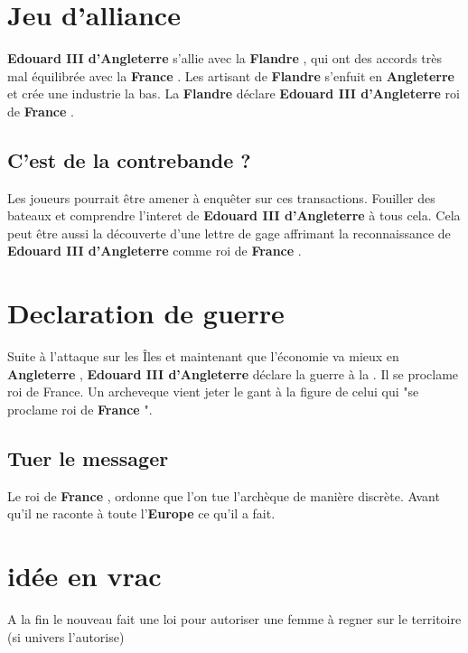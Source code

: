 \documentclass[oneside,12pt]{book}
\newcommand{\France}{\textbf{France} }
\newcommand{\Europe}{\textbf{Europe} }
\newcommand{\Angleterre}{\textbf{Angleterre} }
\newcommand{\Flandre}{\textbf{Flandre} }
\newcommand{\EdouardIII}{\textbf{Edouard III d'Angleterre} }%
\begin{document}
\begin{flushleft}
\section{Jeu d'alliance}
    \EdouardIII s'allie avec la \Flandre, qui ont des accords très mal équilibrée avec la \France. Les artisant de \Flandre s'enfuit en \Angleterre et crée une industrie la bas. La \Flandre déclare \EdouardIII roi de \France.  

    \subsection{C'est de la contrebande ?}
    Les joueurs pourrait être amener à enquêter sur ces transactions. Fouiller des bateaux et comprendre l'interet de \EdouardIII à tous cela. Cela peut être aussi la découverte d'une lettre de gage affrimant la reconnaissance de \EdouardIII comme roi de \France. 
    
\section{Declaration de guerre}
 Suite à l'attaque sur les Îles et maintenant que l'économie va mieux en \Angleterre, \EdouardIII déclare la guerre à la \PhilipeIV. Il se proclame roi de France.
Un archeveque vient jeter le gant à la figure de celui qui "se proclame roi de \France". 

\subsection{Tuer le messager}
Le roi de \France, ordonne que l'on tue l'archèque de manière discrète. Avant qu'il ne raconte à toute l'\Europe ce qu'il a fait. 




\section{idée en vrac}
A la fin le nouveau fait une loi pour autoriser une femme à regner sur le territoire (si univers l'autorise)







\end{flushleft}
\end{document}
